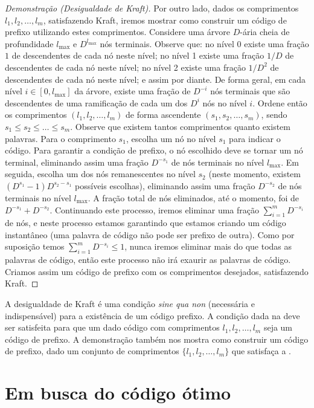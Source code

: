 \begin{proof}[Demonstração (Desigualdade de Kraft)]
Por outro lado, dados os comprimentos $l_1, l_2, \ldots, l_m$, satisfazendo Kraft, iremos mostrar como
construir um código de prefixo utilizando estes comprimentos.
Considere uma árvore $D$-ária cheia de profundidade $l_{\text{max}}$ e $D^{l_{\text{max}}}$ nós terminais.
Observe que: no nível 0 existe uma fração $1$ de descendentes de cada nó neste nível;
no nível 1 existe uma fração $1/D$ de descendentes de cada nó neste nível;
no nível 2 existe uma fração $1/D^2$ de descendentes de cada nó neste nível; e assim por diante.
De forma geral, em cada nível $i \in [0, l_{\text{max}}]$ da árvore, existe uma fração de $D^{-i}$
nós terminais que são descendentes de uma ramificação de cada um dos $D^i$ nós no nível $i$.
Ordene então os comprimentos $(l_1, l_2, \ldots, l_m)$ de forma ascendente $(s_1, s_2, \ldots, s_m)$,
sendo $s_1 \leq s_2 \leq \ldots \leq s_m$. Observe que existem tantos comprimentos quanto existem palavras.
Para o comprimento $s_1$, escolha um nó no nível $s_1$ para indicar o código.
Para garantir a condição de prefixo, o nó escolhido deve se tornar um nó terminal, eliminando assim uma
fração $D^{-s_1}$ de nós terminais no nível $l_{\text{max}}$.
Em seguida, escolha um dos nós remanescentes no nível $s_2$ (neste momento, existem $(D^{s_1}-1)D^{s_2-s_1}$
possíveis escolhas), eliminando assim uma fração $D^{-s_2}$ de nós terminais no nível $l_{\text{max}}$.
A fração total de nós eliminados, até o momento, foi de $D^{-s_1} + D^{-s_2}$.
Continuando este processo, iremos eliminar uma fração $\sum_{i=1}^{m} D^{-s_i}$ de nós, e neste processo
estamos garantindo que estamos criando um código instantâneo (uma palavra de código não pode ser prefixo de outra).
Como por suposição temos $\sum_{i=1}^{m} D^{-s_i} \leq 1$, nunca iremos eliminar mais do que todas as palavras
de código, então este processo não irá exaurir as palavras de código.
Criamos assim um código de prefixo com os comprimentos desejados, satisfazendo Kraft.
\end{proof}

A desigualdade de Kraft é uma condição \emph{sine qua non} (necessária e
indispensável) para a existência de um código prefixo.  A condição dada na
 deve ser satisfeita para que um dado código com
comprimentos $l_1, l_2, \ldots, l_m$ seja um código de prefixo.  A demonstração
também nos mostra como construir um código de prefixo, dado um conjunto de
comprimentos $\{l_1, l_2, \ldots, l_m\}$ que satisfaça a
.


\section{Em busca do código ótimo}

